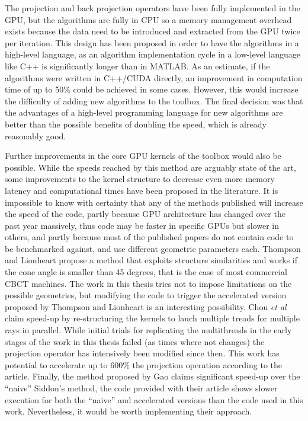 The projection and back projection operators have been fully implemented in the GPU, but the algorithms are fully in CPU so a memory management overhead exists because the data need to be introduced and extracted from the GPU twice per iteration. This design has been proposed in order to have the algorithms in a high-level language, as an algorithm implementation cycle in a low-level language like C++ is significantly longer than in MATLAB. As an estimate, if the algorithms were written in C++/CUDA directly, an improvement in computation time of up to 50\% could be achieved in some cases. However, this would increase the difficulty of adding new algorithms to the toolbox. The final decision was that the advantages of a high-level programming language for new algorithms are better than the possible benefits of doubling the speed, which is already reasonably good. 

Further improvements in the core GPU kernels of the toolbox would also be possible. While the speeds reached by this method are arguably state of the art, some improvements to the kernel structure to decrease even more memory latency and computational times have been proposed in the literature. It is impossible to know with certainty that any of the methods published will increase the speed of the code, partly because GPU architecture has changed over the past year massively, thus code may be faster in specific GPUs but slower in others, and partly because most of the published papers do not contain code to be benchmarked against, and use different geometric parameters each. Thompson and Lionheart\cite{thompson2014gpu} propose a method that exploits structure similarities and works if the cone angle is smaller than 45 degrees, that is the case of most commercial CBCT machines. The work in this thesis tries not to impose limitations on the possible geometries, but modifying the code to trigger the accelerated version proposed by Thompson and Lionheart is an interesting possibility. Chou \emph{et al}\cite{chou2011fast} claim speed-up by re-structuring the kernels to lauch multiple treads for multiple rays in parallel. While initial trials for replicating the multithreads in the early stages of the work in this thesis failed (as times where not changes) the projection operator has intensively been modified since then. This work has potential to accelerate up to 600\% the projection operation according to the article. Finally, the method proposed by Gao\cite{gao2012fast} claims significant speed-up over the ``naive'' Siddon's method, the code provided with their article shows slower execution for both the ``naive'' and accelerated versions than the code used in this work. Nevertheless, it would be worth implementing their approach.


